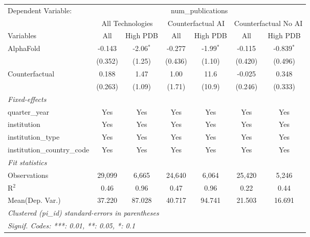 \begingroup
\centering
\begin{tabular}{lcccccc}
   \tabularnewline \midrule \midrule
   Dependent Variable: & \multicolumn{6}{c}{num\_publications}\\
 & \multicolumn{2}{c}{All Technologies} & \multicolumn{2}{c}{Counterfactual AI} & \multicolumn{2}{c}{Counterfactual No AI} \\
\cmidrule(lr){1-1}\cmidrule(lr){2-3} \cmidrule(lr){4-5} \cmidrule(lr){6-7}
Variables & \multicolumn{1}{c}{All} & \multicolumn{1}{c}{High PDB} & \multicolumn{1}{c}{All} & \multicolumn{1}{c}{High PDB} & \multicolumn{1}{c}{All} & \multicolumn{1}{c}{High PDB} \\
\cmidrule(lr){1-1}\cmidrule(lr){2-2} \cmidrule(lr){3-3} \cmidrule(lr){4-4} \cmidrule(lr){5-5} \cmidrule(lr){6-6} \cmidrule(lr){7-7}
   AlphaFold                    & -0.143  & -2.06$^{*}$ & -0.277  & -1.99$^{*}$ & -0.115  & -0.839$^{*}$\\   
                                & (0.352) & (1.25)      & (0.436) & (1.10)      & (0.420) & (0.496)\\   
   Counterfactual               & 0.188   & 1.47        & 1.00    & 11.6        & -0.025  & 0.348\\   
                                & (0.263) & (1.09)      & (1.71)  & (10.9)      & (0.246) & (0.333)\\   
   \midrule
   \emph{Fixed-effects}\\
   quarter\_year                & Yes     & Yes         & Yes     & Yes         & Yes     & Yes\\  
   institution                  & Yes     & Yes         & Yes     & Yes         & Yes     & Yes\\  
   institution\_type            & Yes     & Yes         & Yes     & Yes         & Yes     & Yes\\  
   institution\_country\_code   & Yes     & Yes         & Yes     & Yes         & Yes     & Yes\\  
   \midrule
   \emph{Fit statistics}\\
   Observations                 & 29,099  & 6,665       & 24,640  & 6,064       & 25,420  & 5,246\\  
   R$^2$                        & 0.46    & 0.96        & 0.47    & 0.96        & 0.22    & 0.44\\  
Mean(Dep. Var.) & 37.220 & 87.028 & 40.717 & 94.741 & 21.503 & 16.691 \\
   \midrule \midrule
   \multicolumn{7}{l}{\emph{Clustered (pi\_id) standard-errors in parentheses}}\\
   \multicolumn{7}{l}{\emph{Signif. Codes: ***: 0.01, **: 0.05, *: 0.1}}\\
\end{tabular}
\par\endgroup
